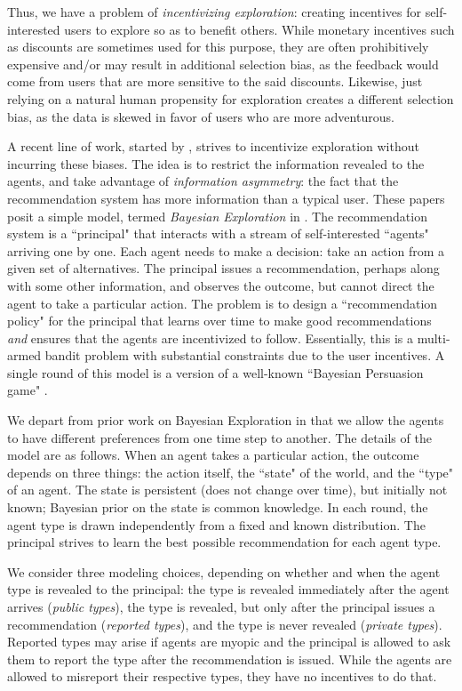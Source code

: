 Thus, we have a problem of \emph{incentivizing exploration}: creating incentives for self-interested users to explore so as to benefit others. While monetary incentives such as discounts are sometimes used for this purpose, they are often prohibitively expensive and/or may result in additional selection bias, as the feedback would come from users that are more sensitive to the said discounts. Likewise, just relying on a natural human propensity for exploration creates a different selection bias, as the data is skewed in favor of users who are more adventurous.

A recent line of work, started by \cite{Kremer-JPE14}, strives to incentivize exploration without incurring these biases. The idea is to restrict the information revealed to the agents, and take advantage of \emph{information asymmetry}: the fact that the recommendation system has more information than a typical user. These papers posit a simple model, termed \emph{Bayesian Exploration} in \cite{ICexplorationGames-ec16}. The recommendation system is a ``principal" that interacts with a stream of self-interested ``agents" arriving one by one. Each agent needs to make a decision: take an action from a given set of alternatives. The principal issues a recommendation, perhaps along with some other information, and observes the outcome, but cannot direct the agent to take a particular action. The problem is to design a ``recommendation policy" for the principal that learns over time to make good recommendations \emph{and} ensures that the agents are incentivized to follow. Essentially, this is a multi-armed bandit problem with substantial constraints due to the user incentives. A single round of this model is a version of a well-known ``Bayesian Persuasion game" \cite{Kamenica-aer11}.

We depart from prior work on Bayesian Exploration in that we allow the agents to have different preferences from one time step to another. The details of the model are as follows. When an agent takes a particular action, the outcome depends on three things: the action itself, the ``state" of the world, and the ``type" of an agent. The state is persistent (does not change over time), but initially not known; Bayesian prior on the state is common knowledge. In each round, the agent type is drawn independently from a fixed and known distribution. The principal strives to learn the best possible recommendation for each agent type.

We consider three modeling choices, depending on whether and when the agent type is revealed to the principal: the type is revealed immediately after the agent arrives (\emph{public types}), the type is revealed, but only after the principal issues a recommendation (\emph{reported types}), and the type is never revealed (\emph{private types}). Reported types may arise if agents are myopic and the principal is allowed to ask them to report the type after the recommendation is issued. While the agents are allowed to misreport their respective types, they have no incentives to do that. 

